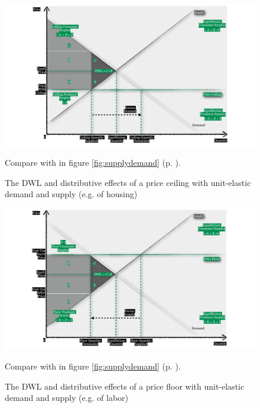 \begin{figure}[htbp]
	\begin{center}
	\includegraphics[width=1\textwidth]{./img/price-ceiling}  
	\caption[Efficiency and Equity of a Price Ceiling]{The \gls{DWL} and distributive effects of a price ceiling with unit-elastic demand and supply (e.g. of housing)}	
	\end{center}
	\scriptsize{Compare with  in figure \ref{fig:supplydemand} (p. \pageref{fig:supplydemand}).}
	\label{fig:price-ceiling}
\end{figure}

\begin{figure}[htbp]
	\begin{center}
	\includegraphics[width=1\textwidth]{./img/price-floor}  
	\caption[Efficiency and Equity of a Price Floor]{The \gls{DWL} and distributive effects of a price floor with unit-elastic demand and supply (e.g. of labor)}
	\end{center}
	\scriptsize{Compare with  in figure \ref{fig:supplydemand} (p. \pageref{fig:supplydemand}).}
	\label{fig:price-floor}
\end{figure}

